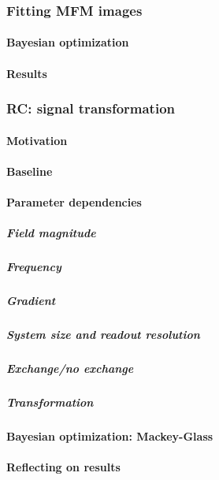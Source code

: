 \subsubsection{Fitting MFM images}\label{sec:3:OOP:MFM}
\paragraph{Bayesian optimization}
\paragraph{Results} %
\subsubsection{RC: signal transformation}
\paragraph{Motivation} %
\paragraph{Baseline}
\paragraph{Parameter dependencies}
\subparagraph{Field magnitude}
\subparagraph{Frequency}
\subparagraph{Gradient}
\subparagraph{System size and readout resolution}
\subparagraph{Exchange/no exchange}
\subparagraph{Transformation}
\paragraph{Bayesian optimization: Mackey-Glass}
\paragraph{Reflecting on results} %
